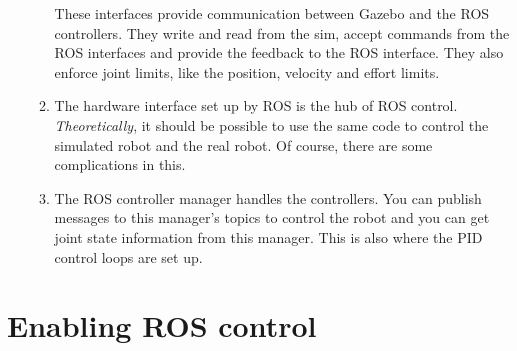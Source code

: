 \documentclass{article}
\begin{document}
\begin{enumerate}
\begin{enumerate}
                These interfaces provide communication between Gazebo and the ROS controllers. They write and 
                read from the sim, accept commands from the ROS interfaces and provide the feedback to the ROS 
                interface. They also enforce joint limits, like the position, velocity and effort limits.
                \item The hardware interface set up by ROS is the hub of ROS control. \emph{Theoretically}, it 
                should be possible to use the same code to control the simulated robot and the real robot. Of course,
                there are some complications in this.
                \item The ROS controller manager handles the controllers. You can publish messages to this manager's topics
                 to control the robot and you can get joint state information from this manager.
                 This is also where the PID control loops are set up.
            \end{enumerate}
        \end{enumerate}
    \section{Enabling ROS control}
\end{document}
